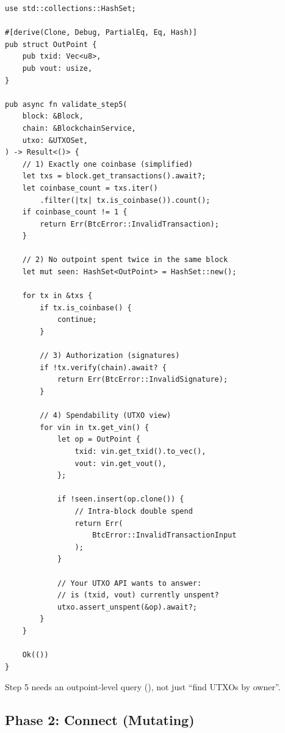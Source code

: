 \begin{listing}[H]
\caption{Step 5 validation pseudocode}
\label{lst:ch10-validate-step5}
\begin{verbatim}
use std::collections::HashSet;

#[derive(Clone, Debug, PartialEq, Eq, Hash)]
pub struct OutPoint {
    pub txid: Vec<u8>,
    pub vout: usize,
}

pub async fn validate_step5(
    block: &Block,
    chain: &BlockchainService,
    utxo: &UTXOSet,
) -> Result<()> {
    // 1) Exactly one coinbase (simplified)
    let txs = block.get_transactions().await?;
    let coinbase_count = txs.iter()
        .filter(|tx| tx.is_coinbase()).count();
    if coinbase_count != 1 {
        return Err(BtcError::InvalidTransaction);
    }

    // 2) No outpoint spent twice in the same block
    let mut seen: HashSet<OutPoint> = HashSet::new();

    for tx in &txs {
        if tx.is_coinbase() {
            continue;
        }

        // 3) Authorization (signatures)
        if !tx.verify(chain).await? {
            return Err(BtcError::InvalidSignature);
        }

        // 4) Spendability (UTXO view)
        for vin in tx.get_vin() {
            let op = OutPoint {
                txid: vin.get_txid().to_vec(),
                vout: vin.get_vout(),
            };

            if !seen.insert(op.clone()) {
                // Intra-block double spend
                return Err(
                    BtcError::InvalidTransactionInput
                );
            }

            // Your UTXO API wants to answer:
            // is (txid, vout) currently unspent?
            utxo.assert_unspent(&op).await?;
        }
    }

    Ok(())
}
\end{verbatim}
\end{listing}

\begin{notebox}
Step 5 needs an outpoint-level query (), not just ``find UTXOs by owner''.
\end{notebox}

\subsection{Phase 2: Connect (Mutating)}
\label{sec:ch10-phase2-connect}

